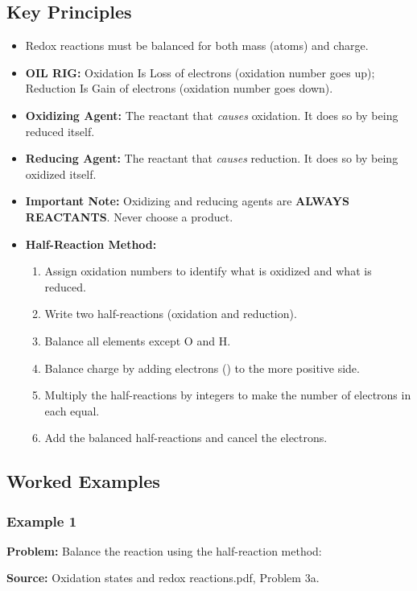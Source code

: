 \documentclass{article}
\begin{document}
\subsection{Key Principles}
\begin{itemize}
    \item Redox reactions must be balanced for both mass (atoms) and charge.
    \item \textbf{OIL RIG:} Oxidation Is Loss of electrons (oxidation number goes up); Reduction Is Gain of electrons (oxidation number goes down).
    \item \textbf{Oxidizing Agent:} The reactant that \textit{causes} oxidation. It does so by being reduced itself.
    \item \textbf{Reducing Agent:} The reactant that \textit{causes} reduction. It does so by being oxidized itself.
    \item \textbf{Important Note:} Oxidizing and reducing agents are \textbf{ALWAYS REACTANTS}. Never choose a product.
    \item \textbf{Half-Reaction Method:}
        \begin{enumerate}
            \item Assign oxidation numbers to identify what is oxidized and what is reduced.
            \item Write two half-reactions (oxidation and reduction).
            \item Balance all elements except O and H.
            \item Balance charge by adding electrons () to the more positive side.
            \item Multiply the half-reactions by integers to make the number of electrons in each equal.
            \item Add the balanced half-reactions and cancel the electrons.
        \end{enumerate}
\end{itemize}

\subsection{Worked Examples}
\subsubsection{Example 1}
\textbf{Problem:} Balance the reaction using the half-reaction method: 

\textbf{Source:} Oxidation states and redox reactions.pdf, Problem 3a.
\end{document}
